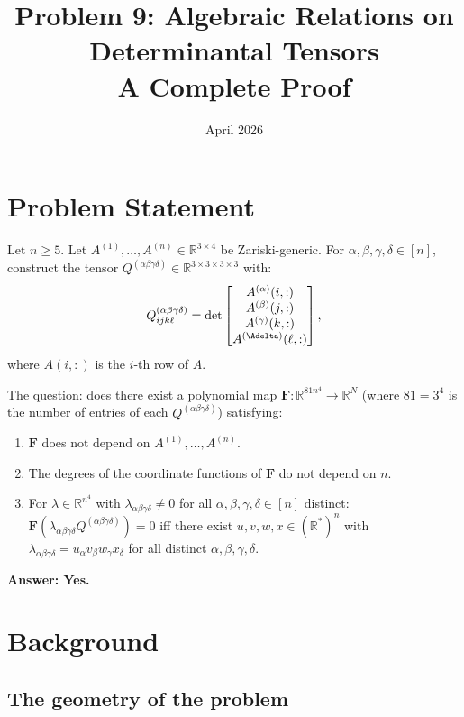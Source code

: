 \documentclass[12pt]{article}
\title{Problem 9: Algebraic Relations on Determinantal Tensors\\
\large A Complete Proof}
\author{}
\date{April 2026}
\begin{document}
\maketitle

\section{Problem Statement}

Let $n \geq 5$. Let $A^{(1)}, \ldots, A^{(n)} \in \mathbb{R}^{3 \times 4}$ be Zariski-generic. For $\alpha, \beta, \gamma, \delta \in [n]$, construct the tensor $Q^{(\alpha\beta\gamma\delta)} \in \mathbb{R}^{3 \times 3 \times 3 \times 3}$ with:
\[
Q^{(\alpha\beta\gamma\delta)}_{ijk\ell} = \det\begin{bmatrix} A^{(\alpha)}(i,:) \\ A^{(\beta)}(j,:)  \\ A^{(\gamma)}(k,:) \\ A^{(\Adelta)}(\ell,:) \end{bmatrix},
\]
where $A(i,:)$ is the $i$-th row of $A$.

The question: does there exist a polynomial map $\mathbf{F}: \mathbb{R}^{81n^4} \to \mathbb{R}^N$ (where $81 = 3^4$ is the number of entries of each $Q^{(\alpha\beta\gamma\delta)}$) satisfying:
\begin{enumerate}
\item[(P1)] $\mathbf{F}$ does not depend on $A^{(1)}, \ldots, A^{(n)}$.
\item[(P2)] The degrees of the coordinate functions of $\mathbf{F}$ do not depend on $n$.
\item[(P3)] For $\lambda \in \mathbb{R}^{n^4}$ with $\lambda_{\alpha\beta\gamma\delta} \neq 0$ for all $\alpha,\beta,\gamma,\delta \in [n]$ distinct: $\mathbf{F}(\lambda_{\alpha\beta\gamma\delta} Q^{(\alpha\beta\gamma\delta)}) = 0$ iff there exist $u,v,w,x \in (\mathbb{R}^*)^n$ with $\lambda_{\alpha\beta\gamma\delta} = u_\alpha v_\beta w_\gamma x_\delta$ for all distinct $\alpha,\beta,\gamma,\delta$.
\end{enumerate}

\textbf{Answer: Yes.}

\section{Background}

\subsection{The geometry of the problem}
\end{document}
